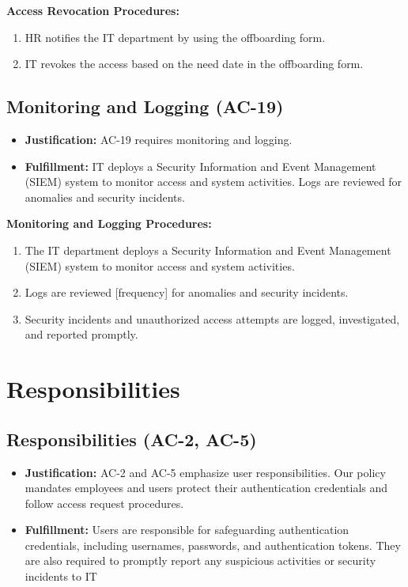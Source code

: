 \textbf{Access Revocation Procedures:}
\begin{enumerate}[label=\alph*.]
    \item HR notifies the IT department by using the offboarding form.
    \item IT revokes the access based on the need date in the offboarding form.
\end{enumerate}

\subsection{Monitoring and Logging (AC-19)}
\begin{itemize}
    \item \textbf{Justification:} AC-19 requires monitoring and logging. 
    \item \textbf{Fulfillment:} IT deploys a Security Information and Event Management (SIEM) system to monitor access and system activities. Logs are reviewed for anomalies and security incidents. 
\end{itemize}

\textbf{Monitoring and Logging Procedures:}
\begin{enumerate}[label=\alph*.]
    \item The IT department deploys a Security Information and Event Management (SIEM) system to monitor access and system activities.
    \item Logs are reviewed [frequency] for anomalies and security incidents.
    \item Security incidents and unauthorized access attempts are logged, investigated, and reported promptly.
\end{enumerate}

\section{Responsibilities}

\subsection{Responsibilities (AC-2, AC-5)}
\begin{itemize}
    \item \textbf{Justification:} AC-2 and AC-5 emphasize user responsibilities. Our policy mandates employees and users protect their authentication credentials and follow access request procedures.
    \item \textbf{Fulfillment:} Users are responsible for safeguarding authentication credentials, including usernames, passwords, and authentication tokens. They are also required to promptly report any suspicious activities or security incidents to IT 
\end{itemize}

